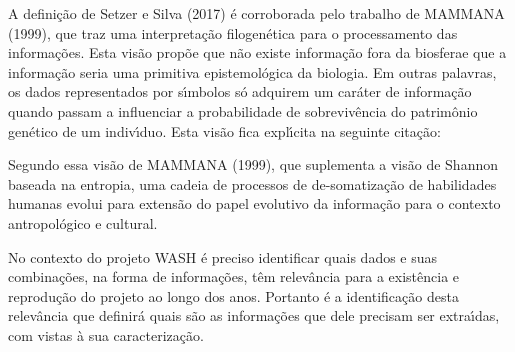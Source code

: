 \documentclass[
12pt,		%
openright,	%
twoside,  %
a4paper,			%
chapter=TITLE,		%
english,			%
french,				%
spanish,			%
brazil				%
]{USPSC-classe/USPSC}
\begin{document}
A defini\c{c}\~ao de Setzer e Silva (2017) \'e corroborada pelo trabalho de MAMMANA (1999), que traz uma interpreta\c{c}\~ao filogen\'etica para o processamento das informa\c{c}\~oes. Esta vis\~ao prop\~oe que \textquotedbl n\~ao existe informa\c{c}\~ao fora da biosfera\textquotedbl  e que a informa\c{c}\~ao seria uma primitiva epistemol\'ogica da biologia. Em outras palavras, os dados representados por s\'{\i}mbolos s\'o adquirem um car\'ater de informa\c{c}\~ao quando passam a influenciar a probabilidade de sobreviv\^encia do patrim\^onio gen\'etico de um indiv\'{\i}duo. Esta vis\~ao fica expl\'{\i}cita na seguinte cita\c{c}\~ao:















\noindent\begin{center}\mbox{\centering{}}\end{center}


Segundo essa vis\~ao de  MAMMANA (1999), que suplementa a vis\~ao de Shannon baseada na entropia, uma cadeia de processos de de-somatiza\c{c}\~ao de habilidades humanas evolui para extens\~ao do papel evolutivo da informa\c{c}\~ao para o contexto antropol\'ogico e cultural.














No contexto do projeto WASH \'e preciso identificar quais dados e suas combina\c{c}\~oes, na forma de informa\c{c}\~oes, t\^em relev\^ancia para a exist\^encia e reprodu\c{c}\~ao do projeto ao longo dos anos. Portanto \'e a identifica\c{c}\~ao desta relev\^ancia que definir\'a quais s\~ao as informa\c{c}\~oes que dele precisam ser extra\'{\i}das, com vistas \`a sua caracteriza\c{c}\~ao.
\end{document}
